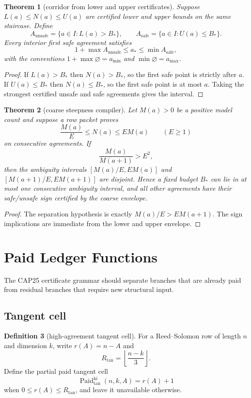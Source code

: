\documentclass[11pt]{article}
\newtheorem{theorem}{Theorem}[section]
\theoremstyle{definition}
\newtheorem{definition}[theorem]{Definition}
\theoremstyle{remark}
\newcommand{\Paid}{\operatorname{Paid}}
\newcommand{\floor}[1]{\left\lfloor #1\right\rfloor}
\begin{document}
\begin{theorem}[corridor from lower and upper certificates]\label{thm:corridor}
Suppose $L(a)\le N(a)\le U(a)$ are certified lower and upper bounds on the same
staircase.  Define
\[
        A_{\mathrm{unsafe}}=\{a\in I: L(a)>B_*\},
        \qquad
        A_{\mathrm{safe}}=\{a\in I: U(a)\le B_*\}.
\]
Every interior first safe agreement satisfies
\[
        1+\max A_{\mathrm{unsafe}}\le a_* \le \min A_{\mathrm{safe}},
\]
with the conventions $1+\max\varnothing=a_{\min}$ and
$\min\varnothing=a_{\max}$.
\end{theorem}

\begin{proof}
If $L(a)>B_*$ then $N(a)>B_*$, so the first safe point is strictly after $a$.
If $U(a)\le B_*$ then $N(a)\le B_*$, so the first safe point is at most $a$.
Taking the strongest certified unsafe and safe agreements gives the interval.
\end{proof}

\begin{theorem}[coarse steepness compiler]\label{thm:steepness}
Let $M(a)>0$ be a positive model count and suppose a row packet proves
\[
        \frac{M(a)}{E}\le N(a)\le E M(a)
        \qquad(E\ge1)
\]
on consecutive agreements.  If
\[
        \frac{M(a)}{M(a+1)}>E^2,
\]
then the ambiguity intervals $[M(a)/E, E M(a)]$ and
$[M(a+1)/E, E M(a+1)]$ are disjoint.  Hence a fixed budget $B_*$ can lie in at
most one consecutive ambiguity interval, and all other agreements have their
safe/unsafe sign certified by the coarse envelope.
\end{theorem}

\begin{proof}
The separation hypothesis is exactly $M(a)/E>E M(a+1)$.  The sign implications
are immediate from the lower and upper envelope.
\end{proof}

\section{Paid Ledger Functions}

The CAP25 certificate grammar should separate branches that are already paid
from residual branches that require new structural input.

\subsection{Tangent cell}

\begin{definition}[high-agreement tangent cell]
For a Reed--Solomon row of length $n$ and dimension $k$, write $r(A)=n-A$ and
\[
        R_{\tan}=\floor{\frac{n-k}{3}}.
\]
Define the partial paid tangent cell
\[
        \Paid_{\tan}^{\mathrm{hi}}(n,k,A)=r(A)+1
\]
when $0\le r(A)\le R_{\tan}$, and leave it unavailable otherwise.
\end{definition}
\end{document}
